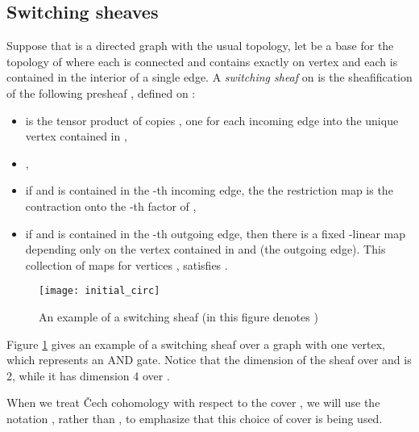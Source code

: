 \documentclass{amsart}
\theoremstyle{plain}
\theoremstyle{definition}
\begin{document}
\subsection{Switching sheaves}
Suppose that  is a directed graph with the usual topology, let  be a base for the topology of  where each  is connected and contains exactly on vertex and each  is contained in the interior of a single edge.
A {\it switching sheaf}  on  is the sheafification of the following presheaf , defined on :
\begin{itemize}
\item  is the tensor product of copies , one for each incoming edge into the unique vertex contained in ,
\item ,
\item if  and  is contained in the
  -th incoming edge, the the restriction map  is the contraction onto the -th factor of ,
\item if  and  is contained in the
  -th outgoing edge, then there is a fixed -linear map
   depending only on the vertex 
  contained in  and  (the outgoing edge).  This
  collection of maps  for vertices , satisfies .
\end{itemize}

\begin{figure}
\begin{center}
\texttt{[image: initial\_circ]}
\caption{An example of a switching sheaf (in this figure  denotes )}
\label{initial_circ_fig}
\end{center}
\end{figure}

Figure \ref{initial_circ_fig} gives an example of a switching sheaf
over a graph with one vertex, which represents an AND gate.  Notice that the dimension of the sheaf over  and  is 2, while it has dimension 4 over .  
 
When we treat \v{C}ech cohomology with respect to the cover , we will use the notation , rather than , to emphasize that this choice of cover is being used.
\end{document}
